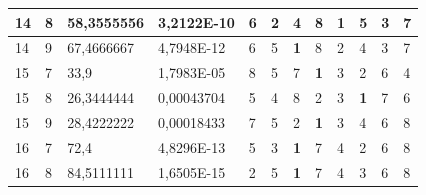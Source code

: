 \documentclass[conference]{IEEEtran}
\begin{document}
\begin{table}[]
\begin{tabular}{|llll|llllllll|}
		\multicolumn{1}{|l|}{14}  & \multicolumn{1}{l|}{8}         & \multicolumn{1}{l|}{58,3555556}    & 3,2122E-10 & \multicolumn{1}{l|}{6}   & \multicolumn{1}{l|}{2}          & \multicolumn{1}{l|}{4}          & \multicolumn{1}{l|}{8}          & \multicolumn{1}{l|}{\textbf{1}} & \multicolumn{1}{l|}{5}          & \multicolumn{1}{l|}{3}   & 7                      \\ \hline
		\multicolumn{1}{|l|}{14}  & \multicolumn{1}{l|}{9}         & \multicolumn{1}{l|}{67,4666667}    & 4,7948E-12 & \multicolumn{1}{l|}{6}   & \multicolumn{1}{l|}{5}          & \multicolumn{1}{l|}{\textbf{1}} & \multicolumn{1}{l|}{8}          & \multicolumn{1}{l|}{2}          & \multicolumn{1}{l|}{4}          & \multicolumn{1}{l|}{3}   & 7                      \\ \hline
		\multicolumn{1}{|l|}{15}  & \multicolumn{1}{l|}{7}         & \multicolumn{1}{l|}{33,9}          & 1,7983E-05 & \multicolumn{1}{l|}{8}   & \multicolumn{1}{l|}{5}          & \multicolumn{1}{l|}{7}          & \multicolumn{1}{l|}{\textbf{1}} & \multicolumn{1}{l|}{3}          & \multicolumn{1}{l|}{2}          & \multicolumn{1}{l|}{6}   & 4                      \\ \hline
		\multicolumn{1}{|l|}{15}  & \multicolumn{1}{l|}{8}         & \multicolumn{1}{l|}{26,3444444}    & 0,00043704 & \multicolumn{1}{l|}{5}   & \multicolumn{1}{l|}{4}          & \multicolumn{1}{l|}{8}          & \multicolumn{1}{l|}{2}          & \multicolumn{1}{l|}{3}          & \multicolumn{1}{l|}{\textbf{1}} & \multicolumn{1}{l|}{7}   & 6                      \\ \hline
		\multicolumn{1}{|l|}{15}  & \multicolumn{1}{l|}{9}         & \multicolumn{1}{l|}{28,4222222}    & 0,00018433 & \multicolumn{1}{l|}{7}   & \multicolumn{1}{l|}{5}          & \multicolumn{1}{l|}{2}          & \multicolumn{1}{l|}{\textbf{1}} & \multicolumn{1}{l|}{3}          & \multicolumn{1}{l|}{4}          & \multicolumn{1}{l|}{6}   & 8                      \\ \hline
		\multicolumn{1}{|l|}{16}  & \multicolumn{1}{l|}{7}         & \multicolumn{1}{l|}{72,4}          & 4,8296E-13 & \multicolumn{1}{l|}{5}   & \multicolumn{1}{l|}{3}          & \multicolumn{1}{l|}{\textbf{1}} & \multicolumn{1}{l|}{7}          & \multicolumn{1}{l|}{4}          & \multicolumn{1}{l|}{2}          & \multicolumn{1}{l|}{6}   & 8                      \\ \hline
		\multicolumn{1}{|l|}{16}  & \multicolumn{1}{l|}{8}         & \multicolumn{1}{l|}{84,5111111}    & 1,6505E-15 & \multicolumn{1}{l|}{2}   & \multicolumn{1}{l|}{5}          & \multicolumn{1}{l|}{\textbf{1}} & \multicolumn{1}{l|}{7}          & \multicolumn{1}{l|}{4}          & \multicolumn{1}{l|}{3}          & \multicolumn{1}{l|}{6}   & 8                      \\ \hline

\end{tabular}
\end{table}
\end{document}
